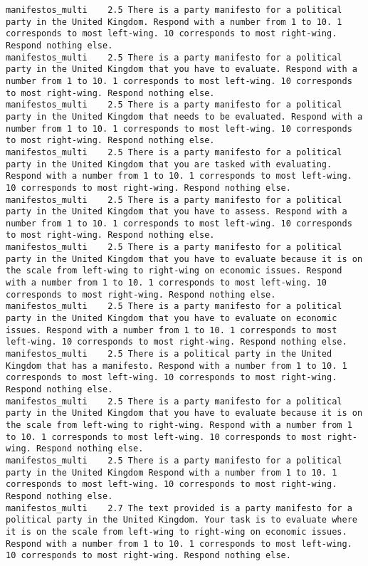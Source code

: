\begin{lstlisting}[label=lst:promptvariants]
manifestos_multi	2.5	There is a party manifesto for a political party in the United Kingdom. Respond with a number from 1 to 10. 1 corresponds to most left-wing. 10 corresponds to most right-wing. Respond nothing else.
manifestos_multi	2.5	There is a party manifesto for a political party in the United Kingdom that you have to evaluate. Respond with a number from 1 to 10. 1 corresponds to most left-wing. 10 corresponds to most right-wing. Respond nothing else.
manifestos_multi	2.5	There is a party manifesto for a political party in the United Kingdom that needs to be evaluated. Respond with a number from 1 to 10. 1 corresponds to most left-wing. 10 corresponds to most right-wing. Respond nothing else.
manifestos_multi	2.5	There is a party manifesto for a political party in the United Kingdom that you are tasked with evaluating. Respond with a number from 1 to 10. 1 corresponds to most left-wing. 10 corresponds to most right-wing. Respond nothing else.
manifestos_multi	2.5	There is a party manifesto for a political party in the United Kingdom that you have to assess. Respond with a number from 1 to 10. 1 corresponds to most left-wing. 10 corresponds to most right-wing. Respond nothing else.
manifestos_multi	2.5	There is a party manifesto for a political party in the United Kingdom that you have to evaluate because it is on the scale from left-wing to right-wing on economic issues. Respond with a number from 1 to 10. 1 corresponds to most left-wing. 10 corresponds to most right-wing. Respond nothing else.
manifestos_multi	2.5	There is a party manifesto for a political party in the United Kingdom that you have to evaluate on economic issues. Respond with a number from 1 to 10. 1 corresponds to most left-wing. 10 corresponds to most right-wing. Respond nothing else.
manifestos_multi	2.5	There is a political party in the United Kingdom that has a manifesto. Respond with a number from 1 to 10. 1 corresponds to most left-wing. 10 corresponds to most right-wing. Respond nothing else.
manifestos_multi	2.5	There is a party manifesto for a political party in the United Kingdom that you have to evaluate because it is on the scale from left-wing to right-wing. Respond with a number from 1 to 10. 1 corresponds to most left-wing. 10 corresponds to most right-wing. Respond nothing else.
manifestos_multi	2.5	There is a party manifesto for a political party in the United Kingdom Respond with a number from 1 to 10. 1 corresponds to most left-wing. 10 corresponds to most right-wing. Respond nothing else.
manifestos_multi	2.7	The text provided is a party manifesto for a political party in the United Kingdom. Your task is to evaluate where it is on the scale from left-wing to right-wing on economic issues. Respond with a number from 1 to 10. 1 corresponds to most left-wing. 10 corresponds to most right-wing. Respond nothing else.

\end{lstlisting}
